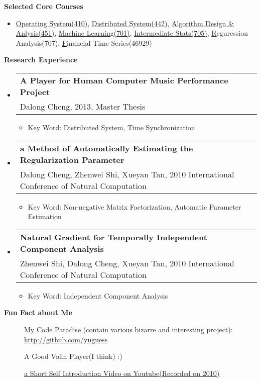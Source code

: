 \documentclass[letterpaper,11pt]{article}
\makeatletter
\newcommand{\resitem}[1]{\item #1 \vspace{-2pt}}
\newcommand{\resheading}[1]{{\large \colorbox{mygrey}{\begin{minipage}{\textwidth}{\textbf{#1 \vphantom{p\^{E}}}}\end{minipage}}}}
\newcommand{\ressubheading}[4]{
\begin{tabular*}{6.5in}{l@{\extracolsep{\fill}}r}
		\textbf{#1} & #2 \\
		{#3}{} & \textit{#4} \\
\end{tabular*}\vspace{-6pt}}
\makeatother
\begin{document}
\resheading{{Selected Core Courses}}
  \begin{itemize}
		\item{\small \href{http://www.cs.cmu.edu/~410/}{Operating System(410)}, 
    \href{http://www.cs.cmu.edu/~dga/15-440/F12/}{Distributed System(442)}, 
    \href{http://www.cs.cmu.edu/~./15451/}{Algorithm Design \& Anlysis(451)}, 
    \href{http://www.cs.cmu.edu/~epxing/Class/10701/}{Machine Learning(701)}, 
    \href{http://www.stat.cmu.edu/~larry/=stat705/}{Intermediate Stats(705)},
    \href{}Reguression Analysis(707),
    \href{}Financial Time Series(46929)}
	\end{itemize}
\resheading{Research Experience}
  \begin{itemize}

  \item 
		\ressubheading{A Player for Human Computer Music 
    Performance Project}{}{Dalong Cheng, 2013, Master Thesis}{}
    { \footnotesize
      \begin{itemize}
        \resitem{Key Word: Distributed System, Time Synchronization}
      \end{itemize}
    }
	
	\item
		\ressubheading{a Method of Automatically Estimating the 
    Regularization Parameter}{}
    {Dalong Cheng, Zhenwei Shi, Xueyan Tan, 
    2010 International Conference of Natural Computation}{}
    { \footnotesize
      \begin{itemize}
      \resitem{Key Word: Non-negative Matrix Factorization, 
      Automatic Parameter Estimation}
      \end{itemize}
    }

		\item 
			\ressubheading{Natural Gradient for Temporally Independent Component Analysis}{}{Zhenwei Shi, Dalong Cheng, Xueyan Tan, 2010 International Conference of Natural Computation}{}
			{ \footnotesize
				\begin{itemize}
					\resitem{Key Word: Independent Component Analysis}
				\end{itemize}
			}

	\end{itemize}  %

\resheading{{Fun Fact about Me}}
	\begin{description}
    \item[] {\href{http://github.com/yuguess}
    {My Code Paradise 
    (contain various bizarre and interesting project):
    http://github.com/yuguess}}

    \item[] {A Good Volin Player(I think) :)}

    \item[] {\href{http://www.youtube.com/watch?v=zGBpT7A_nYM}{a Short Self Introduction Video on Youtube(Recorded on 2010)}}
  \end{description}
\end{document}
